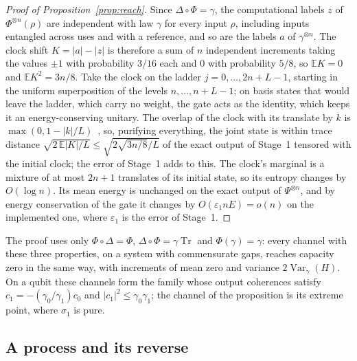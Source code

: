 \documentclass[11pt]{article}
\theoremstyle{definition}
\theoremstyle{remark}
\newcommand{\Tr}{\operatorname{Tr}}
\begin{document}
\begin{proof}[Proof of Proposition~\ref{prop:reach}]
Since $\Delta\circ\Phi=\gamma$, the computational labels $z$ of $\Phi^{\otimes n}(\rho)$ are independent with law $\gamma$ for every input $\rho$, including inputs entangled across uses and with a reference, and so are the labels $a$ of $\gamma^{\otimes n}$. The clock shift $K=|a|-|z|$ is therefore a sum of $n$ independent increments taking the values $\pm1$ with probability $3/16$ each and $0$ with probability $5/8$, so $\mathbb EK=0$ and $\mathbb EK^2=3n/8$. Take the clock on the ladder $j=0,\dots,2n+L-1$, starting in the uniform superposition of the levels $n,\dots,n+L-1$; on basis states that would leave the ladder, which carry no weight, the gate acts as the identity, which keeps it an energy-conserving unitary. The overlap of the clock with its translate by $k$ is $\max(0,1-|k|/L)$~\cite{Aberg14}, so, purifying everything, the joint state is within trace distance $\sqrt{2\,\mathbb E|K|/L}\le\sqrt{2\sqrt{3n/8}/L}$ of the exact output of Stage~1 tensored with the initial clock; the error of Stage~1 adds to this. The clock's marginal is a mixture of at most $2n+1$ translates of its initial state, so its entropy changes by $O(\log n)$. Its mean energy is unchanged on the exact output of $\Psi^{\otimes n}$, and by energy conservation of the gate it changes by $O(\varepsilon_1 nE)=o(n)$ on the implemented one, where $\varepsilon_1$ is the error of Stage~1.
\end{proof}

The proof uses only $\Phi\circ\Delta=\Phi$, $\Delta\circ\Phi=\gamma\Tr$ and $\Phi(\gamma)=\gamma$: every channel with these three properties, on a system with commensurate gaps, reaches capacity zero in the same way, with increments of mean zero and variance $2\operatorname{Var}_\gamma(H)$. On a qubit these channels form the family whose output coherences satisfy $c_1=-(\gamma_0/\gamma_1)c_0$ and $|c_1|^2\le\gamma_0\gamma_1$; the channel of the proposition is its extreme point, where $\sigma_1$ is pure.

\subsection{A process and its reverse}\label{pf:arrow}
\end{document}
